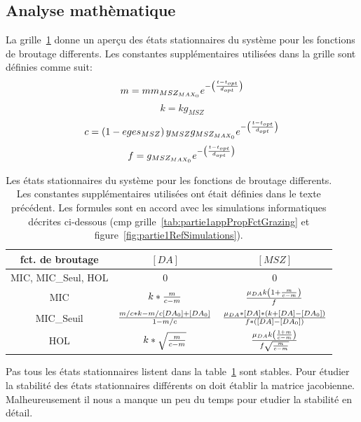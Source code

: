 {\subsection{Analyse mathèmatique}

\par{
La grille~\ref{tab:partie1etatsStat} donne un aperçu des états stationnaires du système
pour les fonctions de broutage differents. Les constantes supplémentaires utilisées
dans la grille sont définies comme suit:
}
\[
m = mm_{MSZ_{MAX_0}} e ^{- \left ( {{t-t_{opt}}\over{d_{opt}}} \right )}
\]
\[
k = kg_{MSZ}
\]
\[
c = \left ( 1 - eges_{MSZ} \right ) y_{MSZ}
g_{MSZ_{MAX_0}} e ^{- \left ( {{t-t_{opt}}\over{d_{opt}}} \right )}
\]
\[
f = g_{MSZ_{MAX_0}} e ^{- \left ( {{t-t_{opt}}\over{d_{opt}}} \right )}
\]

\begin{table}[h!]
\begin{center}
\begin{tabular}{ | c | c c | }
\hline
fct. de broutage & $[DA]$ & $[MSZ]$ \\
\hline
MIC, MIC\_Seul, HOL & 0 & 0 \\
MIC & $k * {{m}\over{c-m}}$ & ${{\mu_{DA} k \left ( 1 + {{m}\over{c-m}} \right )}\over{f}}$ \\
MIC\_Seuil & ${{m/c*k-m/c[DA_0]+[DA_0]}\over{1-m/c}}$ & ${\mu_{DA} * [DA] * (k + [DA] - [DA_0])}\over{f *([DA] - [DA_0])}$ \\
HOL & $k*\sqrt{{{m}\over{c-m}}}$ & ${{\mu_{DA}k \left ( 1 + {m}\over{c-m} \right )}\over{f \sqrt{{m}\over{c-m}}}}$ \\
\hline
\end{tabular}
\end{center}
  \caption{Les états stationnaires du système pour les fonctions de broutage differents. Les
constantes supplémentaires utilisées ont était définies dans le texte précédent. Les formules sont en accord
avec les simulations informatiques décrites ci-dessous (cmp grille~\ref{tab:partie1appPropFctGrazing} et
figure~\ref{fig:partie1RefSimulations}).
}
  \label{tab:partie1etatsStat}
\end{table}
\FloatBarrier

\par{
Pas tous les états stationnaires listent dans la table~\ref{tab:partie1etatsStat} sont stables. Pour
étudier la stabilité des états stationnaires différents on doit établir la matrice jacobienne.
Malheureusement il nous a manque un peu du temps pour etudier la stabilité en détail.
}

}
